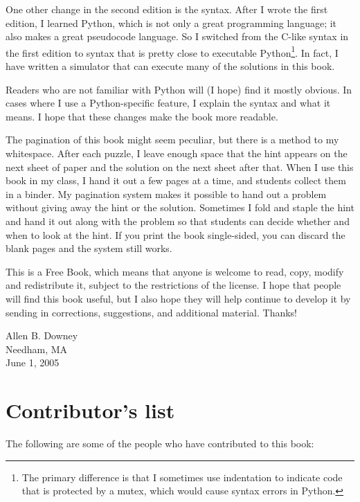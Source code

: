 \documentclass{book}
\begin{document}
One other change in the second edition is the syntax. After I wrote the first edition, I learned Python, which is not only a great programming language; it also makes a great pseudocode language.  So I switched from the C-like syntax in the first edition to syntax that is pretty close to executable Python\footnote{The primary difference is that I sometimes use indentation to indicate code that is protected by a mutex, which would cause syntax errors in Python.}. In fact, I have written a simulator that can execute many of the solutions in this book.

Readers who are not familiar with Python will (I hope) find it mostly obvious.  In cases where I use a Python-specific feature, I explain the syntax and what it means.  I hope that these changes make the book more readable.

The pagination of this book might seem peculiar, but there is a method to my whitespace.  After each puzzle, I leave enough space that the hint appears on the next sheet of paper and the solution on the next sheet after that.  When I use this book in my class, I hand it out a few pages at a time, and students collect them in a binder.  My pagination system makes it possible to hand out a problem without giving away the hint or the solution.  Sometimes I fold and staple the hint and hand it out along with the problem so that students can decide whether and when to look at the hint.  If you print the book single-sided, you can discard the blank pages and the system still works.

This is a Free Book, which means that anyone is welcome to read, copy, modify and redistribute it, subject to the restrictions of the license.  I hope that people will find this book useful, but I also hope they will help continue to develop it by sending in corrections, suggestions, and additional material.  Thanks!

\vspace{0.3in}

\noindent Allen B. Downey \\
\noindent Needham, MA \\
\noindent June 1, 2005 \\


\section*{Contributor's list}

The following are some of the people who have contributed to this
book:
\end{document}
